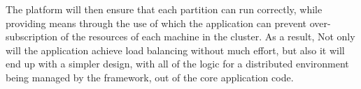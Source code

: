 The platform will then ensure that each partition can run correctly, while
providing means through the use of which the application can prevent
over-subscription of the resources of each machine in the cluster. As a result, Not only will the
application achieve load balancing without
much effort,
but also it will end up with a simpler design, with all
of the logic for a distributed environment being managed by the framework,
out of the core application code.

%
